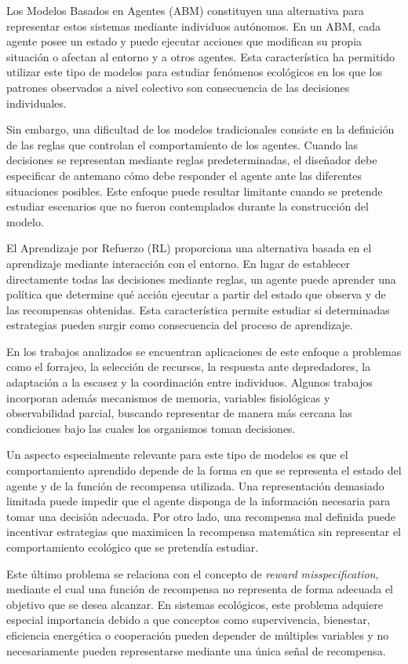 \documentclass[conference]{IEEEtran}
\begin{document}
Los Modelos Basados en Agentes (ABM) constituyen una alternativa para
representar estos sistemas mediante individuos autónomos. En un ABM, cada
agente posee un estado y puede ejecutar acciones que modifican su propia
situación o afectan al entorno y a otros agentes. Esta característica ha
permitido utilizar este tipo de modelos para estudiar fenómenos
ecológicos en los que los patrones observados a nivel colectivo son
consecuencia de las decisiones individuales.

Sin embargo, una dificultad de los modelos tradicionales consiste en la
definición de las reglas que controlan el comportamiento de los agentes.
Cuando las decisiones se representan mediante reglas predeterminadas, el
diseñador debe especificar de antemano cómo debe responder el agente ante
las diferentes situaciones posibles. Este enfoque puede resultar
limitante cuando se pretende estudiar escenarios que no fueron
contemplados durante la construcción del modelo.

El Aprendizaje por Refuerzo (RL) proporciona una alternativa basada en el
aprendizaje mediante interacción con el entorno. En lugar de establecer
directamente todas las decisiones mediante reglas, un agente puede
aprender una política que determine qué acción ejecutar a partir del
estado que observa y de las recompensas obtenidas. Esta característica
permite estudiar si determinadas estrategias pueden surgir como
consecuencia del proceso de aprendizaje.

En los trabajos analizados se encuentran aplicaciones de este enfoque a
problemas como el forrajeo, la selección de recursos, la respuesta ante
depredadores, la adaptación a la escasez y la coordinación entre
individuos. Algunos trabajos incorporan además mecanismos de memoria,
variables fisiológicas y observabilidad parcial, buscando representar de
manera más cercana las condiciones bajo las cuales los organismos toman
decisiones.

Un aspecto especialmente relevante para este tipo de modelos es que el
comportamiento aprendido depende de la forma en que se representa el
estado del agente y de la función de recompensa utilizada. Una
representación demasiado limitada puede impedir que el agente disponga
de la información necesaria para tomar una decisión adecuada. Por otro
lado, una recompensa mal definida puede incentivar estrategias que
maximicen la recompensa matemática sin representar el comportamiento
ecológico que se pretendía estudiar.

Este último problema se relaciona con el concepto de
\textit{reward misspecification}, mediante el cual una función de
recompensa no representa de forma adecuada el objetivo que se desea
alcanzar. En sistemas ecológicos, este problema adquiere especial
importancia debido a que conceptos como supervivencia, bienestar,
eficiencia energética o cooperación pueden depender de múltiples
variables y no necesariamente pueden representarse mediante una única
señal de recompensa.
\end{document}
